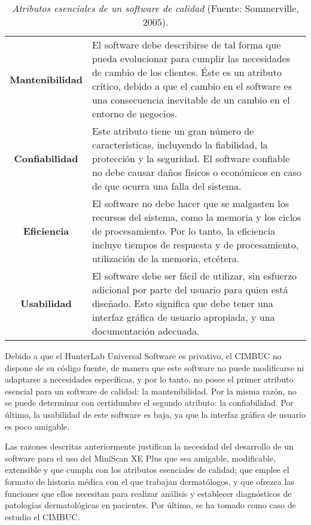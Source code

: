 		\begin{table}[t]
			\small
			\caption[Atributos esenciales de un software de calidad]{\textit{Atributos esenciales de un software de calidad} (Fuente: Sommerville, 2005).}
			\centering
			\setlength{\extrarowheight}{\altocelda}
			\begin{tabulary}{\anchotabla}{|c|J|}
				
				\hline
				 & \\ \hline
			\textbf{Mantenibilidad} & El software debe describirse de tal forma que pueda evolucionar  para cumplir las necesidades de cambio de los 					clientes. \'{E}ste es un atributo cr\'{i}tico, debido a que el cambio en el software es una consecuencia inevitable de un cambio en el entorno de negocios.\\ \hline
			\textbf{Confiabilidad} & Este atributo tiene un gran n\'{u}mero de caracter\'{i}sticas, incluyendo la fiabilidad, la protecci\'{o}n y la seguridad. El software confiable no debe causar da\~{n}os f\'{i}sicos o econ\'{o}micos en caso de que ocurra una falla del sistema.\\ \hline
			\textbf{Eficiencia} & El software no debe hacer que se malgasten los recursos del sistema, como la memoria y los ciclos de procesamiento. Por lo tanto, la eficiencia incluye tiempos de respuesta y de procesamiento, utilizaci\'{o}n de la memoria, etc\'{e}tera.\\ \hline
			\textbf{Usabilidad} & El software debe ser f\'{a}cil de utilizar, sin esfuerzo adicional por parte del usuario para quien est\'{a} dise\~{n}ado. Esto significa que debe tener una interfaz gr\'{a}fica de usuario apropiada, y una documentaci\'{o}n adecuada.\\ \hline
			\end{tabulary}
		\end{table}

Debido a que el HunterLab Universal Software es privativo, el CIMBUC no dispone de su c\'{o}digo fuente, de manera que este software no puede modificarse ni adaptarse a necesidades espec\'{i}ficas, y por lo tanto, no posee el primer atributo esencial para un software de calidad: la mantenibilidad. Por la misma raz\'{o}n, no se puede determinar con certidumbre el segundo atributo: la confiabilidad. Por \'{u}ltimo, la usabilidad de este software es baja, ya que la interfaz gr\'{a}fica de usuario es poco amigable.

Las razones descritas anteriormente justifican la necesidad del desarrollo de un software para el uso del MiniScan XE Plus que sea amigable, modificable, extensible y que cumpla con los atributos esenciales de calidad; que emplee el formato de historia m\'{e}dica con el que trabajan dermat\'{o}logos, y que ofrezca las funciones que ellos necesitan para realizar an\'{a}lisis y establecer diagn\'{o}sticos de patolog\'{i}as dermatol\'{o}gicas en pacientes. Por \'{u}ltimo, se ha tomado como caso de estudio el CIMBUC.